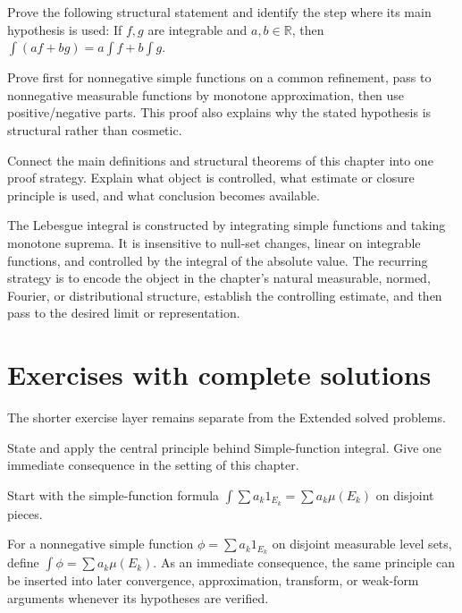 \begin{problem}[Linearity]\label{prob:iii03-problem-11}
Prove the following structural statement and identify the step where its main hypothesis is used: If $f,g$ are integrable and $a,b\in\mathbb R$, then $\int(af+bg)=a\int f+b\int g$.
\end{problem}
\begin{solution}
Prove first for nonnegative simple functions on a common refinement, pass to nonnegative measurable functions by monotone approximation, then use positive/negative parts. This proof also explains why the stated hypothesis is structural rather than cosmetic.
\end{solution}

\begin{problem}\label{prob:iii03-problem-12}
Connect the main definitions and structural theorems of this chapter into one proof strategy. Explain what object is controlled, what estimate or closure principle is used, and what conclusion becomes available.
\end{problem}
\begin{solution}
The Lebesgue integral is constructed by integrating simple functions and taking monotone suprema. It is insensitive to null-set changes, linear on integrable functions, and controlled by the integral of the absolute value. The recurring strategy is to encode the object in the chapter's natural measurable, normed, Fourier, or distributional structure, establish the controlling estimate, and then pass to the desired limit or representation.
\end{solution}
\section{Exercises with complete solutions}
The shorter exercise layer remains separate from the Extended solved problems.

\begin{exercise}\label{exr:iii03-01}
State and apply the central principle behind Simple-function integral. Give one immediate consequence in the setting of this chapter.
\end{exercise}
\begin{hint}
Start with the simple-function formula \(\int \sum a_k1_{E_k}=\sum a_k\mu(E_k)\) on disjoint pieces.
\end{hint}
\begin{solution}
For a nonnegative simple function $\phi=\sum a_k1_{E_k}$ on disjoint measurable level sets, define $\int\phi=\sum a_k\mu(E_k)$. As an immediate consequence, the same principle can be inserted into later convergence, approximation, transform, or weak-form arguments whenever its hypotheses are verified.
\end{solution}

